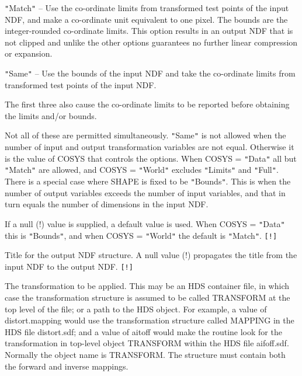 \documentclass[twoside,11pt]{article}
\newcommand{\sstsubsection}[1]{ \item[{#1}] \mbox{} \\}
\newcommand{\sstitem}{\item}
\renewcommand{\sstsubsection}[1]{\item[{#1}]}
\begin{document}
{{{{            \sstitem
            {\tt "}Match{\tt "}  -- Use the co-ordinate limits from transformed test
                           points of the input NDF, and make a co-ordinate
                           unit equivalent to one pixel.  The bounds are the
                           integer-rounded co-ordinate limits.  This option
                           results in an output NDF that is not clipped and
                           unlike the other options guarantees no further
                           linear compression or expansion.

            \sstitem
            {\tt "}Same{\tt "}   -- Use the bounds of the input NDF and take the
                           co-ordinate limits from transformed test points
                           of the input NDF.

         }
         The first three also cause the co-ordinate limits to be
         reported before obtaining the limits and/or bounds.

         Not all of these are permitted simultaneously.  {\tt "}Same{\tt "} is not
         allowed when the number of input and output transformation
         variables are not equal.  Otherwise it is the value of
         COSYS that controls the options.  When COSYS = {\tt "}Data{\tt "} all but
         {\tt "}Match{\tt "} are allowed, and COSYS = {\tt "}World{\tt "} excludes {\tt "}Limits{\tt "} and
         {\tt "}Full{\tt "}.  There is a special case where SHAPE is fixed to be
         {\tt "}Bounds{\tt "}.  This is when the number of output variables exceeds
         the number of input variables, and that in turn equals the
         number of dimensions in the input NDF.

         If a null (!) value is supplied, a default value is used. When
         COSYS = {\tt "}Data{\tt "} this is {\tt "}Bounds{\tt "}, and when COSYS = {\tt "}World{\tt "} the
         default is {\tt "}Match{\tt "}.  {\tt [!]}
      }
      \sstsubsection{
         TITLE = LITERAL (Read)
      }{
         Title for the output NDF structure.  A null value (!)
         propagates the title from the input NDF to the output NDF. {\tt [!]}
      }
      \sstsubsection{
         TRANSFORM = TRN (Read)
      }{
         The transformation to be applied.  This may be an HDS
         container file, in which case the transformation structure is
         assumed to be called TRANSFORM at the top level of the file;
         or a path to the HDS object.  For example, a value of
         distort.mapping would use the transformation structure called
         MAPPING in the HDS file distort.sdf; and a value of aitoff
         would make the routine look for the transformation in top-level
         object TRANSFORM within the HDS file aifoff.sdf.  Normally the
         object name is TRANSFORM.  The structure must contain both the
         forward and inverse mappings.

}}}
\end{document}
